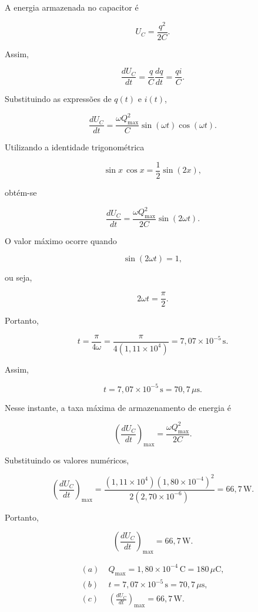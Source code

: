 A energia armazenada no capacitor é

\[
U_C=\frac{q^2}{2C}.
\]

Assim,

\[
\frac{dU_C}{dt}
=
\frac{q}{C}\frac{dq}{dt}
=
\frac{qi}{C}.
\]

Substituindo as expressões de \(q(t)\) e \(i(t)\),

\[
\frac{dU_C}{dt}
=
\frac{\omega Q_{\max}^{2}}{C}
\sin(\omega t)\cos(\omega t).
\]

Utilizando a identidade trigonométrica

\[
\sin x\,\cos x
=
\frac{1}{2}\sin(2x),
\]

obtém-se

\[
\frac{dU_C}{dt}
=
\frac{\omega Q_{\max}^{2}}{2C}
\sin(2\omega t).
\]

O valor máximo ocorre quando

\[
\sin(2\omega t)=1,
\]

ou seja,

\[
2\omega t=\frac{\pi}{2}.
\]

Portanto,

\[
t
=
\frac{\pi}{4\omega}
=
\frac{\pi}{4(1,11\times10^{4})}
=
7,07\times10^{-5}\,\mathrm{s}.
\]

Assim,

\[
\boxed{
t=7,07\times10^{-5}\,\mathrm{s}
=
70,7\,\mu\mathrm{s}
}.
\]

Nesse instante, a taxa máxima de armazenamento de energia é

\[
\left(\frac{dU_C}{dt}\right)_{\max}
=
\frac{\omega Q_{\max}^{2}}{2C}.
\]

Substituindo os valores numéricos,

\[
\left(\frac{dU_C}{dt}\right)_{\max}
=
\frac{(1,11\times10^{4})
      (1,80\times10^{-4})^{2}}
     {2(2,70\times10^{-6})}
=
66,7\,\mathrm{W}.
\]

Portanto,

\[
\boxed{
\left(\frac{dU_C}{dt}\right)_{\max}
=
66,7\,\mathrm{W}
}.
\]

\[
\boxed{
\begin{aligned}
(a)\;&Q_{\max}=1,80\times10^{-4}\,\mathrm{C}=180\,\mu\mathrm{C},\\[2mm]
(b)\;&t=7,07\times10^{-5}\,\mathrm{s}=70,7\,\mu\mathrm{s},\\[2mm]
(c)\;&\left(\frac{dU_C}{dt}\right)_{\max}=66,7\,\mathrm{W}.
\end{aligned}
}
\]

\vspace{1cm}